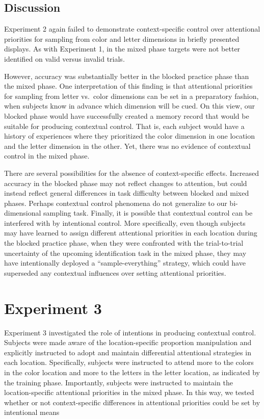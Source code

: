 \documentclass[]{DissertateCUNY}
\begin{document}
\hypertarget{discussion-1}{%
\subsection{Discussion}\label{discussion-1}}

Experiment 2 again failed to demonstrate context-specific control over
attentional priorities for sampling from color and letter dimensions in
briefly presented displays. As with Experiment 1, in the mixed phase
targets were not better identified on valid versus invalid trials.

However, accuracy was substantially better in the blocked practice phase
than the mixed phase. One interpretation of this finding is that
attentional priorities for sampling from letter vs.~color dimensions can
be set in a preparatory fashion, when subjects know in advance which
dimension will be cued. On this view, our blocked phase would have
successfully created a memory record that would be suitable for
producing contextual control. That is, each subject would have a history
of experiences where they prioritized the color dimension in one
location and the letter dimension in the other. Yet, there was no
evidence of contextual control in the mixed phase.

There are several possibilities for the absence of context-specific
effects. Increased accuracy in the blocked phase may not reflect changes
to attention, but could instead reflect general differences in task
difficulty between blocked and mixed phases. Perhaps contextual control
phenomena do not generalize to our bi-dimensional sampling task.
Finally, it is possible that contextual control can be interfered with
by intentional control. More specifically, even though subjects may have
learned to assign different attentional priorities in each location
during the blocked practice phase, when they were confronted with the
trial-to-trial uncertainty of the upcoming identification task in the
mixed phase, they may have intentionally deployed a
``sample-everything'' strategy, which could have superseded any
contextual influences over setting attentional priorities.

\hypertarget{experiment-3}{%
\section{Experiment 3}\label{experiment-3}}

Experiment 3 investigated the role of intentions in producing contextual
control. Subjects were made aware of the location-specific proportion
manipulation and explicitly instructed to adopt and maintain
differential attentional strategies in each location. Specifically,
subjects were instructed to attend more to the colors in the color
location and more to the letters in the letter location, as indicated by
the training phase. Importantly, subjects were instructed to maintain
the location-specific attentional priorities in the mixed phase. In this
way, we tested whether or not context-specific differences in
attentional priorities could be set by intentional means
\end{document}
